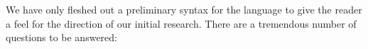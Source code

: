\documentclass[11pt]{article}
\begin{document}


We have only fleshed out a preliminary 
syntax for the language to give the reader a feel for the
direction of our initial research.  There are a tremendous number of
questions to be answered:
\end{document}
